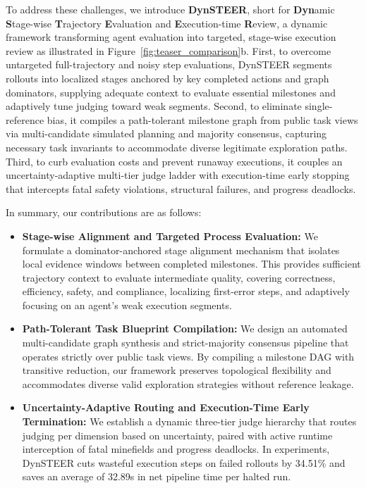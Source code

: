 To address these challenges, we introduce \textbf{DynSTEER}, short for \textbf{Dyn}amic \textbf{S}tage-wise \textbf{T}rajectory \textbf{E}valuation and \textbf{E}xecution-time \textbf{R}eview, a dynamic framework transforming agent evaluation into targeted, stage-wise execution review as illustrated in Figure~\ref{fig:teaser_comparison}b. First, to overcome untargeted full-trajectory and noisy step evaluations, DynSTEER segments rollouts into localized stages anchored by key completed actions and graph dominators, supplying adequate context to evaluate essential milestones and adaptively tune judging toward weak segments. Second, to eliminate single-reference bias, it compiles a path-tolerant milestone graph from public task views via multi-candidate simulated planning and majority consensus, capturing necessary task invariants to accommodate diverse legitimate exploration paths. Third, to curb evaluation costs and prevent runaway executions, it couples an uncertainty-adaptive multi-tier judge ladder with execution-time early stopping that intercepts fatal safety violations, structural failures, and progress deadlocks.

In summary, our contributions are as follows:
\begin{itemize}[leftmargin=*,itemsep=1.5pt,topsep=1pt]
    \item \textbf{Stage-wise Alignment and Targeted Process Evaluation:} We formulate a dominator-anchored stage alignment mechanism that isolates local evidence windows between completed milestones. This provides sufficient trajectory context to evaluate intermediate quality, covering correctness, efficiency, safety, and compliance, localizing first-error steps, and adaptively focusing on an agent's weak execution segments.
    \item \textbf{Path-Tolerant Task Blueprint Compilation:} We design an automated multi-candidate graph synthesis and strict-majority consensus pipeline that operates strictly over public task views. By compiling a milestone DAG with transitive reduction, our framework preserves topological flexibility and accommodates diverse valid exploration strategies without reference leakage.
    \item \textbf{Uncertainty-Adaptive Routing and Execution-Time Early Termination:} We establish a dynamic three-tier judge hierarchy that routes judging per dimension based on uncertainty, paired with active runtime interception of fatal minefields and progress deadlocks. In experiments, DynSTEER cuts wasteful execution steps on failed rollouts by 34.51\% and saves an average of 32.89s in net pipeline time per halted run.
\end{itemize}
